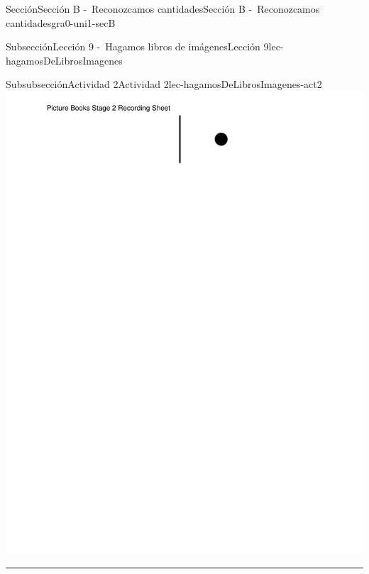 \begin{sectionptx}{Sección}{Sección B -~Reconozcamos cantidades}{}{Sección B -~Reconozcamos cantidades}{}{}{gra0-uni1-secB}
\begin{subsectionptx}{Subsección}{Lección 9 -~Hagamos libros de imágenes}{}{Lección 9}{}{}{lec-hagamosDeLibrosImagenes}
\begin{subsubsectionptx}{Subsubsección}{Actividad 2}{}{Actividad 2}{}{}{lec-hagamosDeLibrosImagenes-act2}
\includegraphics[page=2, rotate=90, trim=90 35 35 35, clip, width=\linewidth, center]{external/blm/pdf-source/center-picture-books-k-5-stage-2-create-picture-books-stage-2-recording-sheet.pdf}
\hrule

\end{subsubsectionptx}
\end{subsectionptx}
\end{sectionptx}
